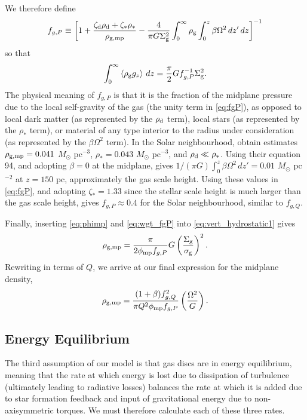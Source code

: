 \documentclass[useAMS,usenatbib]{mn2e}
\newcommand{\phimp}{\phi_{\mathrm{mp}}}
\newcommand{\rhogmp}{\rho_{\rm g,mp}}
\begin{document}
We therefore define
\begin{equation}
\label{eq:fgP}
f_{g,P} \equiv \left[1 + \frac{\zeta_{\rm d} \rho_{\rm d} + \zeta_* \rho_*}{\rhogmp}
- \frac{4}{\pi G \Sigma_{\rm g}^2} \int_0^\infty \rho_{\rm g} \int_0^z \beta\Omega^2\, dz' \, dz
\right]^{-1}
\end{equation}
so that
\begin{equation}
\label{eq:wgt_fgP}
\int_0^\infty \left\langle \rho_{\rm g} g_z\right\rangle \, dz = \frac{\pi}{2} G f_{g,P}^{-1}\Sigma_{\rm g}^2.
\end{equation}
The physical meaning of $f_{g,P}$ is that it is the fraction of the midplane pressure due to the local self-gravity of the gas (the unity term in \autoref{eq:fgP}), as opposed to local dark matter (as represented by the $\rho_{\rm d}$ term), local stars (as represented by the $\rho_*$ term), or material of any type interior to the radius under consideration (as represented by the $\beta\Omega^2$ term). In the Solar neighbourhood, \citet{mckee15a} obtain estimates $\rhogmp = 0.041$ $M_\odot$ pc$^{-3}$, $\rho_* = 0.043$ $M_\odot$ pc$^{-3}$, and $\rho_{\rm d} \ll \rho_*$. Using their equation 94, and adopting $\beta=0$ at the midplane, gives $1/(\pi G) \int_0^z \beta \Omega^2 \, dz' = 0.01$ $M_\odot$ pc$^{-2}$ at $z=150$ pc, approximately the gas scale height. Using these values in \autoref{eq:fgP}, and adopting $\zeta_* = 1.33$ since the stellar scale height is much larger than the gas scale height, gives $f_{g,P} \approx 0.4$ for the Solar neighbourhood, similar to $f_{g,Q}$.

Finally, inserting \autoref{eq:phimp} and \autoref{eq:wgt_fgP} into \autoref{eq:vert_hydrostatic1} gives
\begin{equation}
\rhogmp = \frac{\pi}{2 \phimp f_{g,P}} G \left(\frac{\Sigma_{\rm g}}{\sigma_{\rm g}}\right)^2.
\end{equation}
Rewriting in terms of $Q$, we arrive at our final expression for the midplane density,
\begin{equation}
\label{eq:rhomp}
\rhogmp = \frac{(1+\beta) f_{g,Q}^2}{\pi Q^2 \phimp f_{g,P}} \left(\frac{\Omega^2}{G}\right).
\end{equation}

\subsection{Energy Equilibrium}

The third assumption of our model is that gas discs are in energy equilibrium, meaning that the rate at which energy is lost due to dissipation of turbulence (ultimately leading to radiative losses) balances the rate at which it is added due to star formation feedback and input of gravitational energy due to non-axisymmetric torques. We must therefore calculate each of these three rates.
\end{document}
